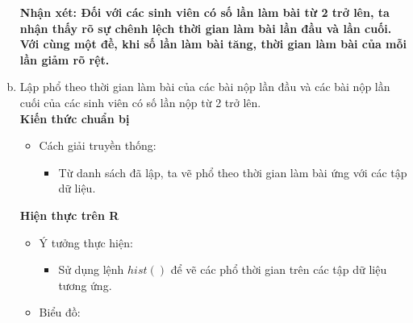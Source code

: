\documentclass[a4paper]{article}
\theoremstyle{definition}
\begin{document}
\begin{enumerate}[a)]
\begin{itemize}
\begin{itemize}
\begin{center}
\begin{tabular}{l c c}
                \end{tabular}
            \end{center}
        \end{itemize}
    \end{itemize}
    \bf Nhận xét: \normalfont Đối với các sinh viên có số lần làm bài từ 2 trở lên, ta nhận thấy rõ sự chênh lệch thời gian làm bài lần đầu và lần cuối. Với cùng một đề, khi số lần làm bài tăng, thời gian làm bài của mỗi lần giảm rõ rệt.
    \bf\item {Lập phổ theo thời gian làm bài của các bài nộp lần đầu và các bài nộp lần cuối của các sinh viên có số lần nộp từ 2 trở lên.}\\[6pt]
    \bf Kiến thức chuẩn bị\normalfont
    \begin{itemize}
        \item Cách giải truyền thống:
        \begin{itemize}
            \item Từ danh sách đã lập, ta vẽ phổ theo thời gian làm bài ứng với các tập dữ liệu.
        \end{itemize}
    \end{itemize}
    \bf Hiện thực trên R\normalfont
    \begin{itemize}
        \item Ý tưởng thực hiện:
        \begin{itemize}
            \item Sử dụng lệnh $hist()$ để vẽ các phổ thời gian trên các tập dữ liệu tương ứng.
        \end{itemize}
        \item Biểu đồ:\\
        \begin{center}
            \begin{tabular}{c c}

\end{tabular}
\end{center}
\end{itemize}
\end{enumerate}
\end{document}
